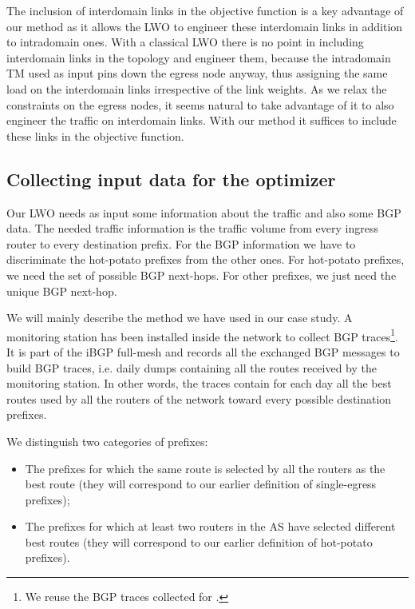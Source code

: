 \documentclass{acm_proc_article-sp}
\begin{document}
The inclusion of interdomain links in the objective function is a key
advantage of our method as it allows the LWO to engineer
these interdomain links in addition to intradomain ones. 
With a classical LWO there is no point in including interdomain links 
in the topology and engineer them,
because the intradomain TM used as input pins down the egress node anyway, 
thus assigning the same
load on the interdomain links irrespective of the link weights.
As we relax the constraints on the egress nodes, it seems natural to take advantage of it to
also engineer the traffic on interdomain links. With our method it suffices 
to include these links in the objective function. 

\subsection{Collecting input data for the optimizer}
\label{sec:datacollect}

Our LWO needs as input some information about the
traffic and also some BGP data. The needed traffic
information is the traffic volume from every ingress
router to every destination prefix. For the BGP information we
have to discriminate the hot-potato prefixes from the other ones.
For hot-potato prefixes, we need the set of possible BGP next-hops.
For other prefixes, we just need the unique BGP next-hop.

We will mainly describe the method we
have used in our case study. A monitoring station has been installed inside the network to collect
BGP traces\footnote{We reuse the BGP traces collected for \cite{uhlig-ccr-matrices}.}. It is part of the iBGP full-mesh
and records all the exchanged BGP messages to build BGP traces, 
i.e. daily dumps containing all the routes received by
the monitoring station. In other words, the traces contain for each day all the best routes
used by all the routers of the network toward every possible
destination prefixes.

We distinguish two categories of prefixes:
\begin{itemize}
\item The prefixes for which the same route is selected by all the
  routers as the best route (they will correspond to our earlier definition of single-egress prefixes);
\item The prefixes for which at least two routers in the AS have
selected different best routes (they will correspond to our earlier definition of hot-potato prefixes).
\end{itemize}
\end{document}
